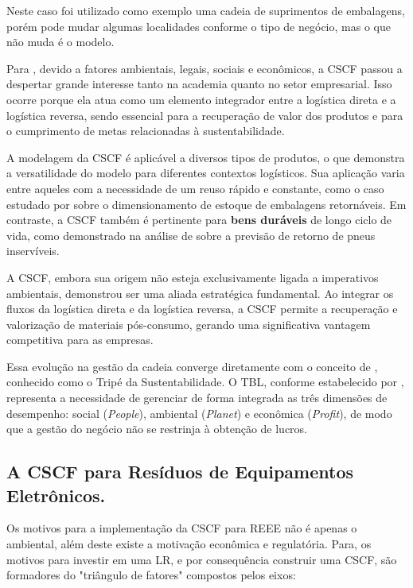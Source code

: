 Neste caso foi utilizado como exemplo uma cadeia de suprimentos de embalagens, porém pode mudar algumas localidades conforme o tipo de negócio, mas o que não muda é o modelo.

Para , devido a fatores ambientais, legais, sociais e econômicos, a CSCF passou a despertar grande interesse tanto na academia quanto no setor empresarial. Isso ocorre porque ela atua como um elemento integrador entre a logística direta e a logística reversa, sendo essencial para a recuperação de valor dos produtos e para o cumprimento de metas relacionadas à sustentabilidade.

A modelagem da CSCF é aplicável a diversos tipos de produtos, o que demonstra a versatilidade do modelo para diferentes contextos logísticos. Sua aplicação varia entre aqueles com a necessidade de um reuso rápido e constante, como o caso estudado por  sobre o dimensionamento de estoque de embalagens retornáveis. Em contraste, a CSCF também é pertinente para \textbf{bens duráveis} de longo ciclo de vida, como demonstrado na análise de  sobre a previsão de retorno de pneus inservíveis.

A CSCF, embora sua origem não esteja exclusivamente ligada a imperativos ambientais, demonstrou ser uma aliada estratégica fundamental. Ao integrar os fluxos da logística direta e da logística reversa, a CSCF permite a recuperação e valorização de materiais pós-consumo, gerando uma significativa vantagem competitiva para as empresas.

Essa evolução na gestão da cadeia converge diretamente com o conceito de , conhecido como o Tripé da Sustentabilidade. O TBL, conforme estabelecido por , representa a necessidade de gerenciar de forma integrada as três dimensões de desempenho: social (\emph{People}), ambiental (\emph{Planet}) e econômica (\emph{Profit}), de modo que a gestão do negócio não se restrinja à obtenção de lucros.

\subsection{A CSCF para Resíduos de Equipamentos Eletrônicos.}\label{A CSCF para Resíduos de Equipamentos Eletrônicos.}

Os motivos para a implementação da CSCF para REEE não é apenas o ambiental, além deste existe a motivação econômica e regulatória. Para,  os motivos para investir em uma LR, e por consequência construir uma CSCF, são formadores do "triângulo de fatores" compostos pelos eixos:

